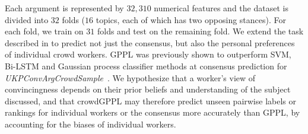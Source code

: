 Each argument is represented by $32,310$ numerical features and the
dataset is divided into $32$ folds ($16$ topics, each of which has two opposing stances). For each fold, we train on $31$ folds and test on the remaining fold.
We extend
the task described in \citet{simpson2018finding} to predict not just the consensus,
but also the personal preferences of individual crowd workers.
GPPL was previously shown to outperform SVM, Bi-LSTM and 
Gaussian process classifier methods at consensus prediction for \emph{UKPConvArgCrowdSample}~\citep{simpson2018finding}. 
We hypothesize that a worker's view of convincingness 
depends on their prior beliefs and understanding of the subject 
discussed, and that crowdGPPL may therefore
predict unseen 
pairwise labels or rankings for individual workers or the consensus more accurately than GPPL,
by accounting 
for the biases of individual workers.


